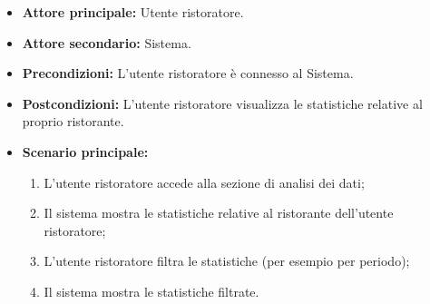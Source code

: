 \label{usecase:Analisi dei dati}
\begin{itemize}
	\item \textbf{Attore principale:} Utente ristoratore.

	\item \textbf{Attore secondario:} Sistema.

	\item \textbf{Precondizioni:}
	      L'utente ristoratore è connesso al Sistema.

	\item \textbf{Postcondizioni:}
	      L'utente ristoratore visualizza le statistiche relative al proprio
	      ristorante.

	\item \textbf{Scenario principale:}
	      \begin{enumerate}
		      \item L'utente ristoratore accede alla sezione di analisi dei
		            dati;

		      \item Il sistema mostra le statistiche relative al ristorante
		            dell'utente ristoratore;

		      \item L'utente ristoratore filtra le statistiche (per esempio
		            per periodo);

		      \item Il sistema mostra le statistiche filtrate.
	      \end{enumerate}
\end{itemize}
